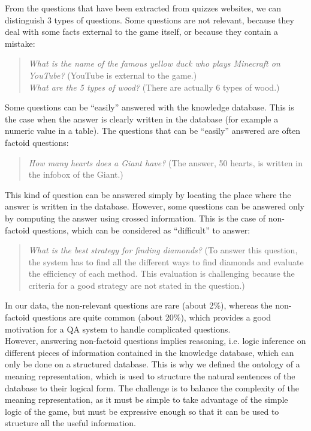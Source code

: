 \documentclass[12pt]{article}
\begin{document}
From the questions that have been extracted from quizzes websites, we can distinguish 3 types of questions. Some questions are not relevant, because they deal with some facts external to the game itself, or because they contain a mistake:
\begin{quote}
\textit{What is the name of the famous yellow duck who plays Minecraft on YouTube?} (YouTube is external to the game.)\\
\textit{What are the 5 types of wood?} (There are actually 6 types of wood.)
\end{quote}
Some questions can be ``easily'' answered with the knowledge database. This is the case when the answer is clearly written in the database (for example a numeric value in a table). The questions that can be ``easily'' answered are often factoid questions:
\begin{quote}
\textit{How many hearts does a Giant have?} (The answer, 50 hearts, is written in the infobox of the Giant.)
\end{quote}
This kind of question can be answered simply by locating the place where the answer is written in the database. However, some questions can be answered only by computing the answer using crossed information. This is the case of non-factoid questions, which can be considered as ``difficult'' to answer:
\begin{quote}
\textit{What is the best strategy for finding diamonds?} (To answer this question, the system has to find all the different ways to find diamonds and evaluate the efficiency of each method. This evaluation is challenging because the criteria for a good strategy are not stated in the question.)
\end{quote}
In our data, the non-relevant questions are rare (about 2\%), whereas the non-factoid questions are quite common (about 20\%), which provides a good motivation for a QA system to handle complicated questions.\\
However, answering non-factoid questions implies reasoning, i.e. logic inference on different pieces of information contained in the knowledge database, which can only be done on a structured database. This is why we defined the ontology of a meaning representation, which is used to structure the natural sentences of the database to their logical form. The challenge is to balance the complexity of the meaning representation, as it must be simple to take advantage of the simple logic of the game, but must be expressive enough so that it can be used to structure all the useful information.
\end{document}
